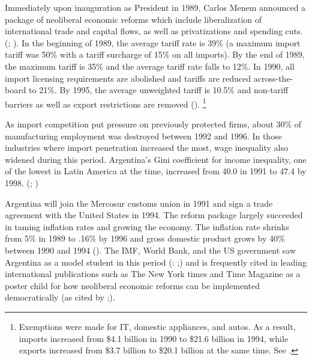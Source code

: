 \documentclass[12pt]{report}
\begin{document}
Immediately upon inauguration as President in 1989, Carlos Menem announced a package of neoliberal
economic reforms which include liberalization of international trade and capital flows, as well as
privatizations and spending cuts. (\citealt[189]{Tommasi:1995wx}; \citealt{Borner:2002cp}). In the
beginning of 1989, the average tariff rate is 39\% (a maximum import tariff was 50\% with a tariff
surcharge of 15\% on all imports). By the end of 1989, the maximum tariff is 35\% and the average
tariff rate falls to 12\%. In 1990, all import licensing requirements are abolished and tariffs are
reduced across-the-board to 21\%. By 1995, the average unweighted tariff is 10.5\% and non-tariff
barriers as well as export restrictions are removed (\citealt[7]{Beker:2011vq}).
\footnote{Exemptions were made for IT, domestic appliances, and autos. As a result, imports
increased from \$4.1 billion in 1990 to \$21.6 billion in 1994, while exports increased from \$3.7
billion to \$20.1 billion at the same time. See \citet{Beker:2011vq}.}

As import competition put pressure on previously protected firms, about 30\% of manufacturing
employment was destroyed between 1992 and 1996. In those industries where import penetration
increased the most, wage inequality also widened during this period. Argentina's Gini coefficient
for income inequality, one of the lowest in Latin America at the time, increased from 40.0 in 1991
to 47.4 by 1998. (\citealt[505]{Galiani:2003fr}; \citealt[11]{Beker:2011vq})

Argentina will join the Mercosur customs union in 1991 and sign a trade agreement with the United
States in 1994. The reform package largely succeeded in taming inflation rates and growing the
economy. The inflation rate shrinks from 5\% in 1989 to .16\% by 1996 and gross domestic product
grows by 40\% between 1990 and 1994 (\citealt[4]{Beker:2011vq}). The IMF, World Bank, and the US
government saw Argentina as a model student in this period (\citealt{Cavallo:2004ta}:
\citealt[142]{Cavallo:2004bf};\citealt{Klein:2002vg}) and is frequently cited in leading
international publications such as The New York times and Time Magazine as a poster child for how
neoliberal economic reforms can be implemented democratically (\citealt{Anonymous:VVaTefru}as cited
by \citealt{stokes2001public};\citealt{Silverstein:2002wm}).
\end{document}
